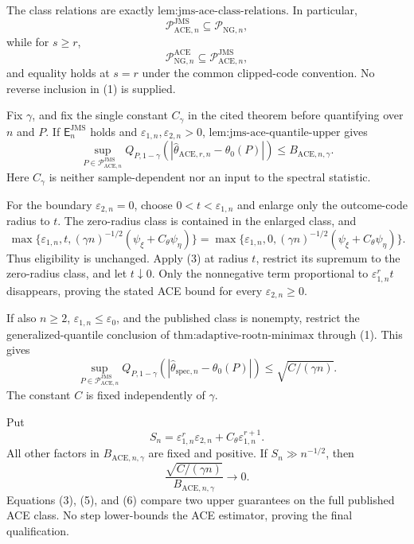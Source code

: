 The class relations are exactly \(\text{lem:jms-ace-class-relations}\).  In particular,
\[
 \mathcal P_{\mathrm{ACE},n}^{\mathrm{JMS}}
 \subseteq\mathcal P_{\mathrm{NG},n}, \tag{1}
\]
while for \(s\ge r\),
\[
 \mathcal P_{\mathrm{NG},n}^{\mathrm{ACE}}
 \subseteq\mathcal P_{\mathrm{ACE},n}^{\mathrm{JMS}}, \tag{2}
\]
and equality holds at \(s=r\) under the common clipped-code convention.  No reverse inclusion in (1) is supplied.

Fix \(\gamma\), and fix the single constant \(C_{\gamma}\) in the cited theorem before quantifying over \(n\) and \(P\).  If \(\mathsf E_n^{\mathrm{JMS}}\) holds and \(\varepsilon_{1,n},\varepsilon_{2,n}>0\), \(\text{lem:jms-ace-quantile-upper}\) gives
\[
 \sup_{P\in\mathcal P_{\mathrm{ACE},n}^{\mathrm{JMS}}}
 Q_{P,1-\gamma}
 (|\widehat\theta_{\mathrm{ACE},r,n}-\theta_0(P)|)
 \le B_{\mathrm{ACE},n,\gamma}. \tag{3}
\]
Here \(C_{\gamma}\) is neither sample-dependent nor an input to the spectral statistic.

For the boundary \(\varepsilon_{2,n}=0\), choose \(0<t<\varepsilon_{1,n}\) and enlarge only the outcome-code radius to \(t\).  The zero-radius class is contained in the enlarged class, and
\[
 \max\{\varepsilon_{1,n},t,
 (\gamma n)^{-1/2}(\psi_{\xi}+C_{\theta}\psi_{\eta})\}
 =
 \max\{\varepsilon_{1,n},0,
 (\gamma n)^{-1/2}(\psi_{\xi}+C_{\theta}\psi_{\eta})\}. \tag{4}
\]
Thus eligibility is unchanged.  Apply (3) at radius \(t\), restrict its supremum to the zero-radius class, and let \(t\downarrow0\).  Only the nonnegative term proportional to \(\varepsilon_{1,n}^rt\) disappears, proving the stated ACE bound for every \(\varepsilon_{2,n}\ge0\).

If also \(n\ge2\), \(\varepsilon_{1,n}\le\varepsilon_0\), and the published class is nonempty, restrict the generalized-quantile conclusion of \(\text{thm:adaptive-rootn-minimax}\) through (1).  This gives
\[
 \sup_{P\in\mathcal P_{\mathrm{ACE},n}^{\mathrm{JMS}}}
 Q_{P,1-\gamma}
 (|\widehat\theta_{\mathrm{spec},n}-\theta_0(P)|)
 \le\sqrt{C/(\gamma n)}. \tag{5}
\]
The constant \(C\) is fixed independently of \(\gamma\).

Put
\[
 S_n=\varepsilon_{1,n}^r\varepsilon_{2,n}
 +C_{\theta}\varepsilon_{1,n}^{r+1}.
\]
All other factors in \(B_{\mathrm{ACE},n,\gamma}\) are fixed and positive.  If \(S_n\gg n^{-1/2}\), then
\[
 \frac{\sqrt{C/(\gamma n)}}{B_{\mathrm{ACE},n,\gamma}}
 \longrightarrow0. \tag{6}
\]
Equations (3), (5), and (6) compare two upper guarantees on the full published ACE class.  No step lower-bounds the ACE estimator, proving the final qualification.